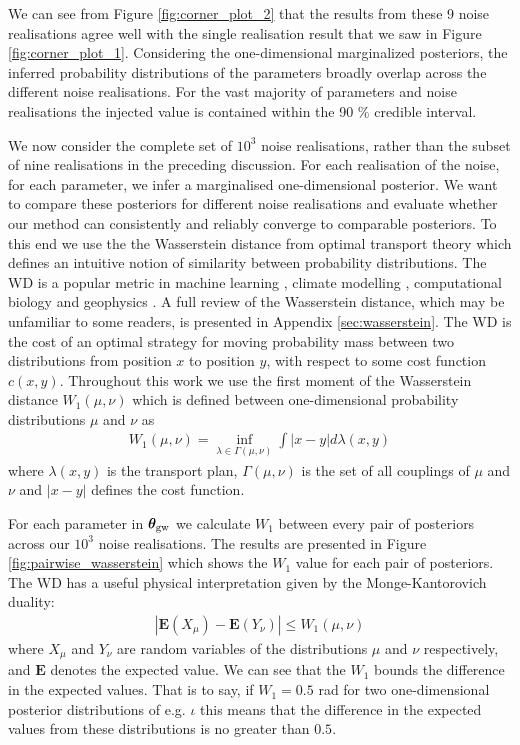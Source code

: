 \documentclass[fleqn,usenatbib,useAMS]{mnras}
\begin{document}
We can see from Figure \ref{fig:corner_plot_2} that the results from these 9 noise realisations agree well with the single realisation result that we saw in  Figure \ref{fig:corner_plot_1}. Considering the one-dimensional marginalized posteriors, the inferred probability distributions of the parameters broadly overlap across the different noise realisations. For the vast majority of parameters and noise realisations the injected value is contained within the 90 \% credible interval. \newline 


We now consider the complete set of $10^3$ noise realisations, rather than the subset of nine realisations in the preceding discussion. For each realisation of the noise, for each parameter, we infer a marginalised one-dimensional posterior. We want to compare these posteriors for different noise realisations and evaluate whether our method can consistently and reliably converge to comparable posteriors. To this end we use the the Wasserstein distance \citep[WD;][]{Wasserstein,Villani2009} from optimal transport theory which defines an intuitive notion of similarity between probability distributions. The WD is a popular metric in machine learning \citep{2017arXiv170107875A}, climate modelling \citep{2022JCli...35.1215P,2023QJRMS.149..843K}, computational biology \citep{GONZALEZDELGADO2023168053} and geophysics \citep{2023GeoRL..5003880M}. A full review of the Wasserstein distance, which may be unfamiliar to some readers, is presented in Appendix \ref{sec:wasserstein}. The WD is the cost of an optimal strategy for moving probability mass between two distributions from position $x$ to position $y$, with respect to some cost function $c(x,y)$. Throughout this work we use the first moment of the Wasserstein distance $W_1(\mu,\nu)$ which is defined between one-dimensional probability distributions $\mu$ and $\nu$ as
\begin{eqnarray}
	W_1(\mu,\nu)=  \inf_{\lambda \in \Gamma(\mu, \nu)} \int |x-y| d \lambda (x,y)
\end{eqnarray}
where $\lambda(x,y)$ is the transport plan, $\Gamma(\mu, \nu)$ is the set of all couplings of $\mu$ and $\nu$ and $ |x-y|$ defines the cost function.  \newline 

For each parameter in $\boldsymbol{\theta}_{\rm gw}$ we calculate $W_1$ between every pair of posteriors across our $10^3$ noise realisations. The results are presented in Figure \ref{fig:pairwise_wasserstein} which shows the $W_1$ value for each pair of posteriors. The WD has a useful physical interpretation given by the Monge-Kantorovich duality:
\begin{eqnarray}
	| \boldsymbol{E}(X_{\mu} )-\boldsymbol{E}(Y_{\nu} ) | \leq W_1(\mu, \nu) \label{eq:WDdefn}
\end{eqnarray}
where $X_{\mu}$ and $Y_{\nu}$ are random variables of the distributions $\mu$ and $\nu$ respectively, and $\boldsymbol{E}$ denotes the expected value. We can see that the $W_1$ bounds the difference in the expected values. That is to say, if $W_1 =0.5$ rad for two one-dimensional posterior distributions of e.g. $\iota$ this means that the difference in the expected values from these distributions is no greater than $0.5$.
\end{document}
